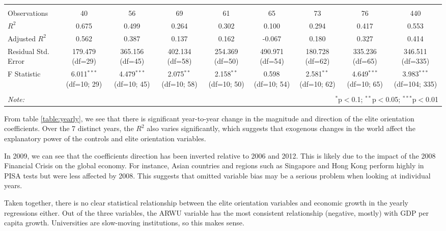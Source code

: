 \documentclass[11pt]{article}
\begin{document}
\begin{table}[H]
{\begin{tabular}{@{\extracolsep{1pt}}lcccccccc}
            \hline \\[-1.8ex]
             Observations & 40 & 56 & 69 & 61 & 65 & 73 & 76 & 440 \\
             $R^2$ & 0.675 & 0.499 & 0.264 & 0.302 & 0.100 & 0.294 & 0.417 & 0.553 \\
             Adjusted $R^2$ & 0.562 & 0.387 & 0.137 & 0.162 & -0.067 & 0.180 & 0.327 & 0.414 \\
             Residual Std. Error & 179.479 (df=29) & 365.156 (df=45) & 402.134 (df=58) & 254.369 (df=50) & 490.971 (df=54) & 180.728 (df=62) & 335.236 (df=65) & 346.511 (df=335) \\
             F Statistic & 6.011$^{***}$ (df=10; 29) & 4.479$^{***}$ (df=10; 45) & 2.075$^{**}$ (df=10; 58) & 2.158$^{**}$ (df=10; 50) & 0.598$^{}$ (df=10; 54) & 2.581$^{**}$ (df=10; 62) & 4.649$^{***}$ (df=10; 65) & 3.983$^{***}$ (df=104; 335) \\
            \hline
            \hline \\[-1.8ex]
            \textit{Note:} & \multicolumn{8}{r}{$^{*}$p$<$0.1; $^{**}$p$<$0.05; $^{***}$p$<$0.01} \\
            \end{tabular}
    }
    \end{table}

From table \ref{table:yearly}, we see that there is significant year-to-year change in the magnitude and direction of the elite orientation coefficients. Over the 7 distinct years, the $R^2$ also varies significantly, which suggests that exogenous changes in the world affect the explanatory power of the controls and elite orientation variables.

In 2009, we can see that the coefficients direction has been inverted relative to 2006 and 2012. This is likely due to the impact of the 2008 Financial Crisis on the global economy. For instance, Asian countries and regions such as Singapore and Hong Kong perform highly in PISA tests but were less affected by 2008. This suggests that omitted variable bias may be a serious problem when looking at individual years.

Taken together, there is no clear statistical relationship between the elite orientation variables and economic growth in the yearly regressions either. Out of the three variables, the ARWU variable has the most consistent relationship (negative, mostly) with GDP per capita growth. Universities are slow-moving institutions, so this makes sense.
\end{document}
